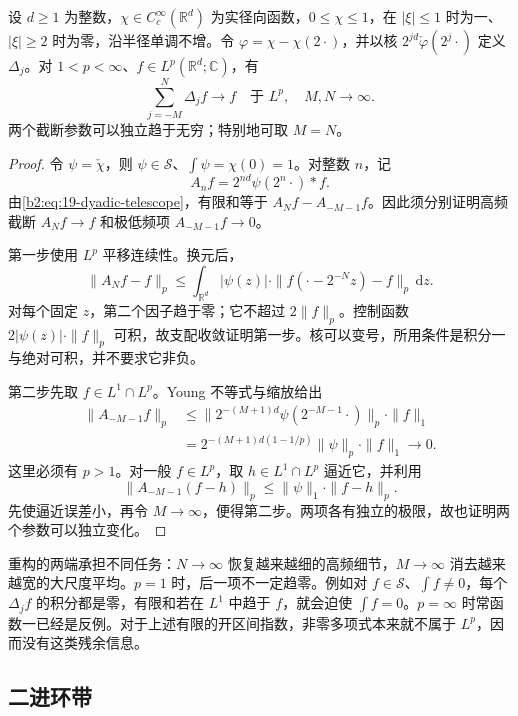 \begin{proposition}[有限指数上的齐次重构]\label{b2:thm:19-lp-resolution}
设 \(d\geq1\) 为整数，\(\chi\in C_c^\infty(\mathbb R^d)\) 为实径向函数，\(0\leq\chi\leq1\)，在 \(|\xi|\leq1\) 时为一、\(|\xi|\geq2\) 时为零，沿半径单调不增。令 \(\varphi=\chi-\chi(2\cdot)\)，并以核 \(2^{jd}\check\varphi(2^j\cdot)\) 定义 \(\Delta_j\)。对 \(1<p<\infty\)、\(f\in L^p(\mathbb R^d;\mathbb C)\)，有
\[
 \sum_{j=-M}^N\Delta_jf\longrightarrow f
 \quad\text{于 }L^p,
 \quad M,N\longrightarrow\infty.
\]
两个截断参数可以独立趋于无穷；特别地可取 \(M=N\)。
\end{proposition}
\begin{proof}
令 \(\psi=\check\chi\)，则 \(\psi\in\mathcal S\)、\(\int\psi=\chi(0)=1\)。对整数 \(n\)，记
\[
 A_nf=2^{nd}\psi(2^n\cdot)*f.
\]
由\eqref{b2:eq:19-dyadic-telescope}，有限和等于 \(A_Nf-A_{-M-1}f\)。因此须分别证明高频截断 \(A_Nf\to f\) 和极低频项 \(A_{-M-1}f\to0\)。

第一步使用 \(L^p\) 平移连续性。换元后，
\[
 \|A_Nf-f\|_p
 \leq\int_{\mathbb R^d}|\psi(z)|\cdot
       \|f(\cdot-2^{-N}z)-f\|_p\,\mathrm dz.
\]
对每个固定 \(z\)，第二个因子趋于零；它不超过 \(2\|f\|_p\)。控制函数 \(2|\psi(z)|\cdot\|f\|_p\) 可积，故支配收敛证明第一步。核可以变号，所用条件是积分一与绝对可积，并不要求它非负。

第二步先取 \(f\in L^1\cap L^p\)。Young 不等式与缩放给出
\[
 \begin{aligned}
 \|A_{-M-1}f\|_p
 &\leq\bigl\|2^{-(M+1)d}\psi(2^{-M-1}\cdot)\bigr\|_p
                 \cdot\|f\|_1\\
 &=2^{-(M+1)d(1-1/p)}\|\psi\|_p\cdot\|f\|_1
 \longrightarrow0.
 \end{aligned}
\]
这里必须有 \(p>1\)。对一般 \(f\in L^p\)，取 \(h\in L^1\cap L^p\) 逼近它，并利用
\[
 \|A_{-M-1}(f-h)\|_p
 \leq\|\psi\|_1\cdot\|f-h\|_p.
\]
先使逼近误差小，再令 \(M\to\infty\)，便得第二步。两项各有独立的极限，故也证明两个参数可以独立变化。
\end{proof}

重构的两端承担不同任务：\(N\to\infty\) 恢复越来越细的高频细节，\(M\to\infty\) 消去越来越宽的大尺度平均。\(p=1\) 时，后一项不一定趋零。例如对 \(f\in\mathcal S\)、\(\int f\ne0\)，每个 \(\Delta_jf\) 的积分都是零，有限和若在 \(L^1\) 中趋于 \(f\)，就会迫使 \(\int f=0\)。\(p=\infty\) 时常函数一已经是反例。对于上述有限的开区间指数，非零多项式本来就不属于 \(L^p\)，因而没有这类残余信息。

\subsection{二进环带}
\label{b2:subsec:190303}

